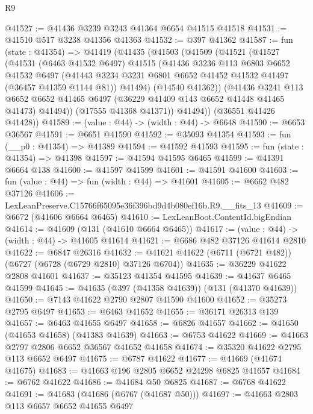 \begin{lexlean}{R9}
\begin{coremodule}
@41527 := @41436 @3239 @3243 @41364 @6654 @41515 @41518
@41531 := @41510 @517 @3238 @41356 @41363
@41532 := @397 @41362
@41587 := fun (state : @41354) =>
  @41419
    (@41435
      (@41503
        (@41509
          (@41521
            (@41527
              (@41531
                (@6463 @41532 @6497)
                @41515
                (@41436
                  @3236
                  @113
                  @6803
                  @6652
                  @41532
                  @6497
                  (@41443 @3234 @3231 @6801 @6652 @41452 @41532 @41497 (@36457 @41359 @1144 @81))
                  @41494)
                (@14540 @41362))
              (@41436
                @3241
                @113
                @6652
                @6652
                @41465
                @6497
                (@36229 @41409 @143 @6652 @41448 @41465 @41473)
                @41494))
            (@17555 @41368 @41371))
          @41494))
      (@36551 @41426 @41428))
@41589 := (value : @44) -> (width : @44) -> @6648
@41590 := @6653 @36567
@41591 := @6651 @41590
@41592 := @35093 @41354
@41593 := fun (__p0 : @41354) => @41389
@41594 := @41592 @41593
@41595 := fun (state : @41354) => @41398
@41597 := @41594 @41595 @6465
@41599 := @41391 @6664 @138
@41600 := @41597 @41599
@41601 := @41591 @41600
@41603 := fun (value : @44) => fun (width : @44) => @41601
@41605 := @6662 @482 @37126
@41606 := LexLeanPreserve.C15766f65095e36f396bd9d4b080ef16b.R9.__fits_13
@41609 := @6672 (@41606 @6664 @6465)
@41610 := LexLeanBoot.ContentId.bigEndian
@41614 := @41609 (@131 (@41610 @6664 @6465))
@41617 := (value : @44) -> (width : @44) -> @41605 @41614
@41621 := @6686 @482 @37126 @41614 @2810
@41622 := @6847 @26316
@41632 := @41621 @41622 (@6711 (@6721 @482)) (@6727 (@6728 (@6729 @2810) @37126 @6704))
@41635 := @36229 @41622 @2808 @41601
@41637 := @35123 @41354 @41595
@41639 := @41637 @6465 @41599
@41645 := @41635 (@397 (@41358 @41639)) (@131 (@41370 @41639))
@41650 := @7143 @41622 @2790 @2807 @41590 @41600
@41652 := @35273 @2795 @6497
@41653 := @6463 @41652
@41655 := @36171 @26313 @139
@41657 := @6463 @41655 @6497
@41658 := @6826 @41657
@41662 := @41650 (@41653 @41658) (@41383 @41639)
@41663 := @6753 @41622
@41669 := @41663 @2797 @2806 @6652 @36567 @41652 @41658
@41674 := @35320 @41622 @2795 @113 @6652 @6497
@41675 := @6787 @41622
@41677 := @41669 (@41674 @41675)
@41683 := @41663 @196 @2805 @6652 @24298 @6825 @41657
@41684 := @6762 @41622
@41686 := @41684 @50 @6825
@41687 := @6768 @41622
@41691 := @41683 (@41686 (@6767 (@41687 @50)))
@41697 := @41663 @2803 @113 @6657 @6652 @41655 @6497

\end{coremodule}
\end{lexlean}
